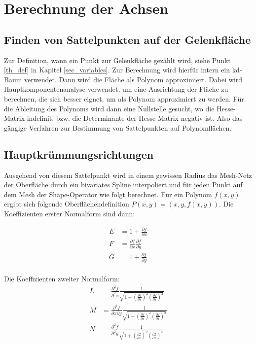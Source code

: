 \documentclass[a4paper, openany, oneside]{memoir}
\begin{document}
\section{Berechnung der Achsen}
\subsection{Finden von Sattelpunkten auf der Gelenkfläche}
Zur Definition, wann ein Punkt zur Gelenkfläche gezählt wird, siehe Punkt \ref{th_def} in Kapitel \ref{sec_variables}. Zur Berechnung wird hierfür intern ein kd-Baum verwendet. Dann wird die Fläche als Polynom approximiert. Dabei wird Hauptkomponentenanalyse verwendet, um eine Ausrichtung der Fläche zu berechnen, die sich besser eignet, um als Polynom approximiert zu werden. Für die Ableitung des Polynoms wird dann eine Nullstelle gesucht, wo die Hesse-Matrix indefinit, bzw. die Determinante der Hesse-Matrix negativ ist. Also das gängige Verfahren zur Bestimmung von Sattelpunkten auf Polynomflächen.

\subsection{Hauptkrümmungsrichtungen}
Ausgehend von diesem Sattelpunkt wird in einem gewissen Radius das Mesh-Netz der Oberfläche durch ein bivariates Spline interpoliert und für jeden Punkt auf dem Mesh der Shape-Operator wie folgt berechnet. Für ein Polynom \(f(x,y)\) ergibt sich folgende Oberflächendefinition \(P(x,y)=(x,y,f(x,y))\). Die Koeffizienten erster Normalform sind dann:

\begin{align}
E &= 1+\frac{\partial f}{\partial x} \\
F &= \frac{\partial f}{\partial x}\frac{\partial f}{\partial y}  \\
G &= 1+\frac{\partial f}{\partial y} \\
\end{align}   

Die Koeffizienten zweiter Normalform:
\begin{align}
L &= \frac{\partial^2 f}{\partial^2 x}\frac{1}{\sqrt{1+(\frac{\partial f}{\partial x})^2(\frac{\partial f}{\partial x})^2}} \\
M &= \frac{\partial^2 f}{\partial x\partial y}\frac{1}{\sqrt{1+(\frac{\partial f}{\partial x})^2(\frac{\partial f}{\partial x})^2}} \\
N &= \frac{\partial^2 f}{\partial^2 y}\frac{1}{\sqrt{1+(\frac{\partial f}{\partial x})^2(\frac{\partial f}{\partial x})^2}} \\
\end{align}  
\end{document}
